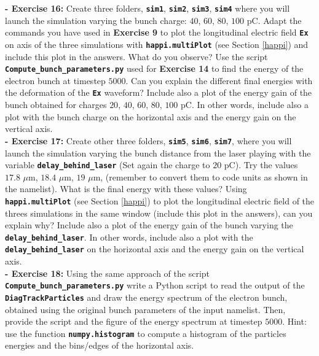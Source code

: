 \documentclass{article}
\newcommand{\commandline}[1]{\texttt{\textbf{#1}}}
\begin{document}
\textbf{ - Exercise 16:} Create three folders, \commandline{sim1}, \commandline{sim2}, \commandline{sim3}, \commandline{sim4} where you will launch the simulation varying the bunch charge: $40$, $60$, $80$, $100$ pC. Adapt the commands you have used in \textbf{Exercise 9} to plot the longitudinal electric field \commandline{Ex} on axis of the three simulations with \commandline{happi.multiPlot} (see Section \ref{happi}) and include this plot in the answers. What do you observe? Use the script \commandline{Compute\_bunch\_parameters.py} used for \textbf{Exercise 14} to find the energy of the electron bunch at timestep $5000$. Can you explain the different final energies with the deformation of the \commandline{Ex} waveform? Include also a plot of the energy gain of the bunch obtained for charges $20$, $40$, $60$, $80$, $100$ pC. In other words, include also a plot with the bunch charge on the horizontal axis and the energy gain on the vertical axis.\\

\textbf{ - Exercise 17:} Create other three folders, \commandline{sim5}, \commandline{sim6}, \commandline{sim7}, where you will launch the simulation varying the bunch distance from the laser playing with the variable \commandline{delay\_behind\_laser} (Set again the charge to $20$ pC). Try the values $17.8$ $\mu$m, $18.4$ $\mu$m, $19$ $\mu$m, (remember to convert them to code units as shown in the namelist). What is the final energy with these values? Using \commandline{happi.multiPlot} (see Section \ref{happi}) to plot the longitudinal electric field of the threes simulations in the same window (include this plot in the answers), can you explain why? Include also a plot of the energy gain of the bunch varying the \commandline{delay\_behind\_laser}. In other words, include also a plot with the \commandline{delay\_behind\_laser} on the horizontal axis and the energy gain on the vertical axis.\\

\textbf{- Exercise 18:} Using the same approach of the script \commandline{Compute\_bunch\_parameters.py} write a Python script to read the output of the \commandline{DiagTrackParticles} and draw the energy spectrum of the electron bunch, obtained using the original bunch parameters of the input namelist. Then, provide the script and the figure of the energy spectrum at timestep $5000$. Hint: use the function \commandline{numpy.histogram} to compute a histogram of the particles energies and the bins/edges of the horizontal axis.\\
\end{document}
